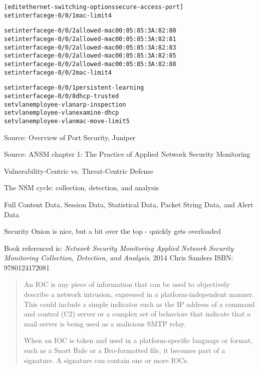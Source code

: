 \documentclass[Screen16to9,17pt]{foils}
\begin{document}

\begin{alltt}\small
[edit ethernet-switching-options secure-access-port]
set interface ge-0/0/1 mac-limit 4

set interface ge-0/0/2 allowed-mac 00:05:85:3A:82:80
set interface ge-0/0/2 allowed-mac 00:05:85:3A:82:81
set interface ge-0/0/2 allowed-mac 00:05:85:3A:82:83
set interface ge-0/0/2 allowed-mac 00:05:85:3A:82:85
set interface ge-0/0/2 allowed-mac 00:05:85:3A:82:88
set interface ge-0/0/2 mac-limit 4

set interface ge-0/0/1 persistent-learning
set interface ge-0/0/8 dhcp-trusted
set vlan employee-vlan arp-inspection
set vlan employee-vlan examine-dhcp
set vlan employee-vlan mac-move-limit 5
\end{alltt}

Source: Overview of Port Security, Juniper\\ {\small{}}






Source: ANSM chapter 1: The Practice of Applied Network Security Monitoring
\begin{list2}
\item Vulnerability-Centric vs. Threat-Centric Defense
\item The NSM cycle: collection, detection, and analysis
\item Full Content Data, Session Data, Statistical Data, Packet String Data, and Alert Data
\item Security Onion is nice, but a bit over the top - quickly gets overloaded

\item Book referenced is: \emph{Network Security Monitoring
Applied Network Security Monitoring Collection, Detection, and Analysis}, 2014 Chris Sanders ISBN: 9780124172081
\end{list2}




\begin{quote}
An IOC is any piece of information that can be used to objectively describe a
network intrusion, expressed in a platform-independent manner. This could include a simple indicator such as the IP address of a command and control (C2) server or a complex set of behaviors that indicate that a mail server is being used as a malicious SMTP relay.

When an IOC is taken and used in a platform-specific language or format, such as a Snort Rule or a Bro-formatted file, it becomes part of a signature. A signature can contain one or more IOCs.
\end{quote}
\end{document}
